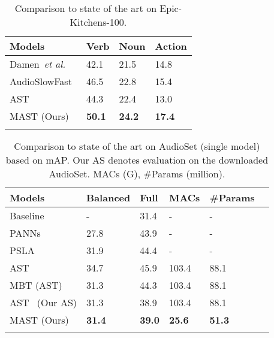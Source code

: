 \documentclass{article}
\def\etal{\emph{et al.}}
\begin{document}
\begin{table}[h]
	\caption{Comparison to state of the art on Epic-Kitchens-100.}  \label{tab:epic}
	\begin{center}
		\begin{tabular}{llll}
			\toprule
			Models & Verb & Noun & Action
			\\  \midrule  
			Damen~\etal~\cite{Damen2021RESCALING} & 42.1 & 21.5 & 14.8 \\
			AudioSlowFast~\cite{kazakos2021slow}            & 46.5 & 22.8 & 15.4 \\ 
			AST~\cite{nagrani2021attention} &44.3 &22.4 & 13.0 \\
			\midrule 
			MAST (Ours) & \textbf{50.1}&\textbf{24.2} &\textbf{17.4} \\ \bottomrule
			\\
		\end{tabular}
	\end{center}
\end{table}
\begin{table}[h]  \caption{Comparison to state of the art on AudioSet (single model) based on mAP. Our AS denotes evaluation on the downloaded AudioSet. MACs (G), \#Params (million).}  \label{tab:as}
	\begin{center}
		\begin{tabular}{llllll}
			\toprule
			Models & Balanced & Full & MACs &\#Params
			\\  \midrule  
			{\color{gray}Baseline~\cite{gemmeke2017audio}} & {\color{gray}-} & {\color{gray}31.4}&{\color{gray}-}&{\color{gray}-} \\
			{\color{gray}PANNs~\cite{kong2020panns}} & {\color{gray}27.8} & {\color{gray}43.9}&{\color{gray}-}&{\color{gray}-} \\
			{\color{gray}PSLA~\cite{gong2021psla}} & {\color{gray}31.9} & {\color{gray}44.4}&{\color{gray}-}&{\color{gray}-} \\
			{\color{gray}AST~\cite{gong2021ast}}            & {\color{gray}34.7} & {\color{gray}45.9}& {\color{gray}103.4}&{\color{gray}88.1} \\ {\color{gray}MBT (AST)~\cite{nagrani2021attention}} &{\color{gray}31.3} &{\color{gray}44.3}& {\color{gray}103.4}&{\color{gray}88.1}\\ \midrule 
			AST~\cite{gong2021ast} (Our AS) &31.3 & 38.9& 103.4&88.1 \\
			\midrule  
MAST (Ours) & \textbf{31.4} &\textbf{39.0} & \textbf{25.6}& \textbf{51.3} \\ \bottomrule
			\\
		\end{tabular}
	\end{center}
\end{table}
\end{document}
